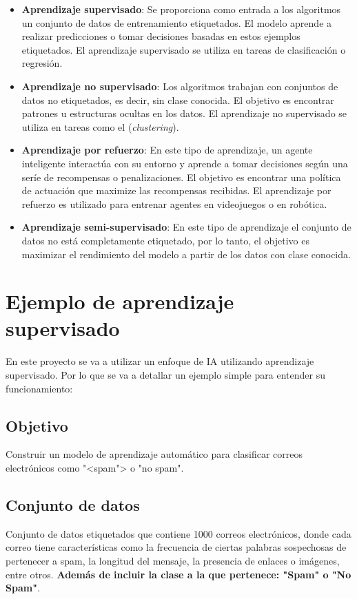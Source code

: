 \begin{itemize}
\item \textbf{Aprendizaje supervisado}: Se proporciona como entrada a los algoritmos un conjunto de datos de entrenamiento etiquetados. El modelo aprende a realizar predicciones o tomar decisiones basadas en estos ejemplos etiquetados. El aprendizaje supervisado se utiliza en tareas de clasificación o regresión.

\item \textbf{Aprendizaje no supervisado}: Los algoritmos trabajan con conjuntos de datos no etiquetados, es decir, sin clase conocida. El objetivo es encontrar patrones u estructuras ocultas en los datos. El aprendizaje no supervisado se utiliza en tareas como el (\textit{clustering}).

\item \textbf{Aprendizaje por refuerzo}: En este tipo de aprendizaje, un agente inteligente interactúa con su entorno y aprende a tomar decisiones según una seríe de recompensas o penalizaciones. El objetivo es encontrar una política de actuación que maximize las recompensas recibidas. El aprendizaje por refuerzo es utilizado para entrenar agentes en videojuegos o en robótica.

\item \textbf{Aprendizaje semi-supervisado}: En este tipo de aprendizaje el conjunto de datos no está completamente etiquetado, por lo tanto, el objetivo es maximizar el rendimiento del modelo a partir de los datos con clase conocida.
\end{itemize}

\section{Ejemplo de aprendizaje supervisado}

En este proyecto se va a utilizar un enfoque de IA utilizando aprendizaje supervisado. Por lo que se va a detallar un ejemplo simple para entender su funcionamiento:

\subsection{Objetivo}
Construir un modelo de aprendizaje automático para clasificar correos electrónicos como "<spam"> o "no spam".

\subsection{Conjunto de datos}
Conjunto de datos etiquetados que contiene 1000 correos electrónicos, donde cada correo tiene características como la frecuencia de ciertas palabras sospechosas de pertenecer a spam, la longitud del mensaje, la presencia de enlaces o imágenes, entre otros. \textbf{Además de incluir la clase a la que pertenece: "Spam" o "No Spam"}.

